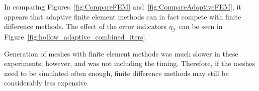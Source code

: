 \documentclass[twocolumn,twoside]{article}
\begin{document}
In comparing Figures~\ref{fig:CompareFEM} and~\ref{fig:CompareAdaptiveFEM}, it appears that adaptive finite element methods can in fact compete with finite difference methods.
The effect of the error indicators $\eta_\mathcal{T}$ can be seen in Figure~\ref{fig:hollow_adaptive_combined_iters}.

Generation of meshes with finite element methods was much slower in these experiments, however, and was not including the timing.
Therefore, if the meshes need to be simulated often enough, finite difference methods may still be considerably less expensive.


%
%
%
%
%
%
%
\end{document}
